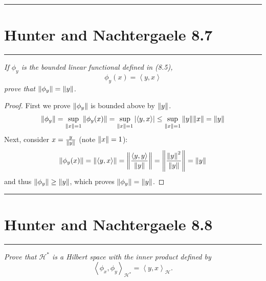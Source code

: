 \documentclass{article} %
\theoremstyle{plain}
\newcommand{\VEC}[2]{\left\langle #1, #2 \right\rangle}
\newcommand{\problem}[1]{
\vspace{.375cm}
\begin{minipage}{\textwidth}
    \begin{center}
        \noindent\rule{5cm}{1pt}
    \end{center}
    \section{\bf #1}
    \begin{center}
        \noindent\rule{5cm}{1pt}
    \end{center}
    \vspace{0.25cm}
\end{minipage}
}
\numberwithin{equation}{section} %
\numberwithin{figure}{section} %
\numberwithin{table}{section} %
\begin{document}
\problem{Hunter and Nachtergaele 8.7}
\emph{If $\phi_y$ is the bounded linear functional defined in (8.5),}
\begin{equation}
    \tag{\it 8.5}
    \phi_y(x) = \VEC{y}{x}
\end{equation}
\emph{prove that $\norm{\phi_y} = \norm{y}$.} \\

\begin{proof}
    First we prove $\norm{\phi_y}$ is bounded above by $\norm{y}$.
    \begin{align*}
        \norm{\phi_y} = \sup_{\norm{x} = 1}\norm{\phi_y(x)} = \sup_{\norm{x} = 1}\left|\VEC{y}{x}\right| \leq \sup_{\norm{x} = 1}\norm{y}\norm{x} = \norm{y}
    \end{align*}
    Next, consider $x = \frac{y}{\norm{y}}$ (note $\norm{x} = 1$):
    \begin{align*}
        \norm{\phi_y(x)} = \norm{\VEC{y}{x}} = \norm{\frac{\VEC{y}{y}}{\norm{y}}} = \norm{\frac{\norm{y}^2}{\norm{y}}} = \norm{y}
    \end{align*}
    and thus $\norm{\phi_y} \geq \norm{y}$, which proves $\norm{\phi_y} = \norm{y}$.
\end{proof}










\problem{Hunter and Nachtergaele 8.8}
\emph{Prove that $\mathcal{H}^*$ is a Hilbert space with the inner product defined by $$ \VEC{\phi_x}{\phi_y}_{\mathcal{H}^*} = \VEC{y}{x}_\mathcal{H}.$$}
\end{document}
